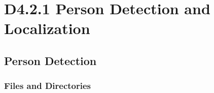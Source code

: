 \documentclass{CSSRforAfrica}
\begin{document}
\newpage
 
 
\pagebreak
\tableofcontents
\newpage

\section{D4.2.1 Person Detection and Localization} 
\subsection{Person Detection} 
\label{subsection:person_detection}

\subsubsection{Files and Directories}
 
\end{document}
